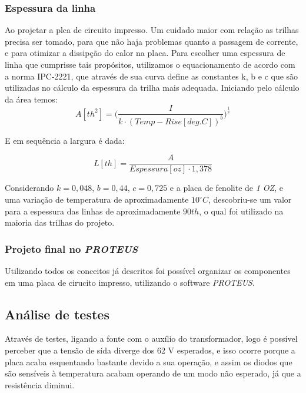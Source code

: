 \documentclass[a4paper,12pt,oneside,openany,table,xcdraw]{article}
\begin{document}
\subsubsection{Espessura da linha}
Ao projetar a plca de circuito impresso. Um cuidado maior com relação as trilhas precisa ser tomado, para que não haja problemas quanto a passagem de corrente, e para otimizar a dissipção do calor na placa. 
Para escolher uma espessura de linha que cumprisse tais propósitos, utilizamos o equacionamento de acordo com a norma IPC-2221, que através de sua curva define as constantes k, b e c que são utilizadas no cálculo da espessura da trilha mais adequada.
Iniciando pelo cálculo da área temos:
\begin{equation}
A [\mathit{th^{2}}] = \Bigg(\dfrac{I}{k \cdot (Temp-Rise [deg. C])^{b}}\Bigg)^{\frac{1}{c}}
 \end{equation}
 \vspace{0.3cm}

E em sequência a largura é dada:

\begin{equation}
L [\mathit{th}] = \dfrac{A}{Espessura [oz] \cdot 1,378}
 \end{equation}
\vspace{0.3cm}

Considerando  $k = 0,048$, $b = 0,44$, $c = 0,725$ e a placa de fenolite de \emph{1 OZ}, e uma variação de temperatura de aproximadamente $10^{\circ}C$, descobriu-se um valor para a espessura das linhas de aproximadamente $90 th$, o qual foi utilizado na maioria das trilhas do projeto.

\vspace{0.2cm}
\subsubsection{Projeto final no \emph{PROTEUS}}
Utilizando todos os conceitos já descritos foi possível organizar os componentes em uma placa de cirucito impresso, utilizando o software \emph{PROTEUS}.

\vspace{0.3cm}
\subsection{Análise de testes} %
Através de testes, ligando a fonte com o auxílio do transformador, logo é possível perceber que a tensão de sída diverge dos 62 V esperados, e isso ocorre porque a placa acaba esquentando bastante devido a sua operação, e assim os diodos que são sensíveis à temperatura acabam operando de um modo não esperado, já que a resistência diminui.
\end{document}
